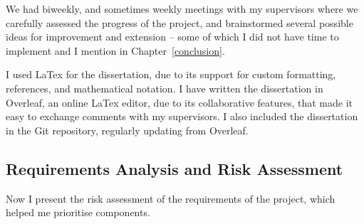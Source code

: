 We had biweekly, and sometimes weekly meetings with my supervisors where we carefully assessed the progress of the project, and brainstormed several possible ideas for improvement and extension -- some of which I did not have time to implement and I mention in Chapter~\ref{conclusion}.

I used LaTex for the dissertation, due to its support for custom formatting, references, and mathematical notation. I have written the dissertation in Overleaf, an online LaTex editor, due to its collaborative features, that made it easy to exchange comments with my supervisors. I also included the dissertation in the Git repository, regularly updating from Overleaf.

\fi

\subsection{Requirements Analysis and Risk Assessment}

Now I present the risk assessment of the requirements of the project, which helped me prioritise components.


